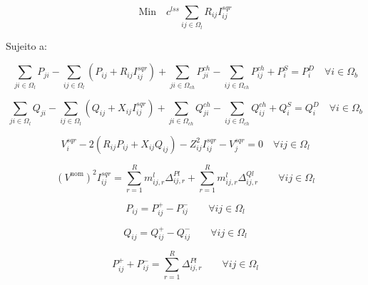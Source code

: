\begin{tcolorbox}[breakable,pad at break*=1mm,colback=white!10,title =\textbf{Problema de PLIM para RSD}]

\begin{equation*}\label{eq:Lin_funcobjet}
    \text{Min}\quad c^{lss}\sum_{ij\in\Omega_l}R_{ij}I_{ij}^{sqr}
\end{equation*}

Sujeito a:


\begin{equation*}\label{eq:Lin_PA}
    \sum_{ji\in\Omega_{l}}P_{ji} - \sum_{ij\in\Omega_{l}}(P_{ij} + R_{ij}I_{ij}^{sqr})+ \sum_{ji\in\Omega_{ch}}P_{ji}^{ch} -\sum_{ij\in\Omega_{ch}}P_{ij}^{ch} + P_{i}^{S} = P_{i}^{D}\quad\forall i \in\Omega_{b}  
\end{equation*}

\begin{equation*}\label{eq:Lin_PR}
    \sum_{ji\in\Omega_{l}}Q_{ji} - \sum_{ij\in\Omega_{l}}(Q_{ij} + X_{ij}I_{ij}^{sqr})+ \sum_{ji\in\Omega_{ch}}Q_{ji}^{ch} -\sum_{ij\in\Omega_{ch}}Q_{ij}^{ch} + Q_{i}^{S} = Q_{i}^{D}\quad\forall i \in\Omega_{b}
\end{equation*}

\begin{equation*}\label{eq:Lin_voltage}
    V_{i}^{sqr} - 2(R_{ij}P_{ij} + X_{ij}Q_{ij}) - Z_{ij}^{2}I_{ij}^{sqr} - V_{j}^{sqr} = 0\quad\forall ij \in \Omega_{l}
\end{equation*}

\begin{equation*}\label{eq:Lin_power}
    (V^{\text{nom}})^{2}I_{ij}^{sqr} = \sum_{r = 1}^{R}m_{ij,r}^{l}\Delta_{ij,r}^{Pl} + \sum_{r = 1}^{R}m_{ij,r}^{l}\Delta_{ij,r}^{Ql} \qquad\forall ij\in\Omega_{l}
\end{equation*}

\begin{equation*}\label{eq:Lin_Pmod}
    P_{ij} = P_{ij}^{+} - P_{ij}^{-}  \qquad\forall ij\in\Omega_{l}
\end{equation*}

\begin{equation*}\label{eq:Lin_Qmod}
    Q_{ij} = Q_{ij}^{+} - Q_{ij}^{-}  \qquad\forall ij\in\Omega_{l}
\end{equation*}

\begin{equation*}\label{eq:Lin_modPAtiva}
        P_{ij}^{+} + P_{ij}^{-} = \sum_{r = 1}^{R}\Delta_{ij,r}^{Pl}  \qquad\forall ij\in\Omega_{l}
\end{equation*}


\end{tcolorbox}
